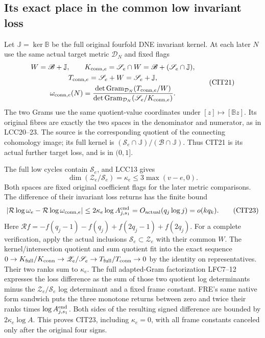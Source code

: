 \documentclass[10pt]{article}
\begin{document}
\subsection{Its exact place in the common low invariant loss}

Let $\mathbb J=\ker\mathbb B$ be the full original fourfold
DNE invariant kernel. At each later $N$ use the same actual
target metric $\mathcal D_N$ and fixed flags
\[
 \begin{gathered}
 W=\mathscr B+\mathbb J,\qquad
 K_{{\rm conn},e}=\mathscr S_e\cap W
                 =\mathscr B+(\mathscr S_e\cap\mathbb J),\\
 T_{{\rm conn},e}=\mathscr S_e+W=\mathscr S_e+\mathbb J,\\
 \omega_{{\rm conn},e}(N)=
 \frac{\det\operatorname{Gram}_{\mathcal D_N}
                       (T_{{\rm conn},e}/W)}
      {\det\operatorname{Gram}_{\mathcal D_N}
                       (\mathscr S_e/K_{{\rm conn},e})}.
 \end{gathered}\tag{CIT21}
\]
The two Grams use the same quotient-value coordinates under
$[z]\mapsto[\mathbb Bz]$. Its original fibres are exactly the
two spaces in the denominator and numerator, as in LCC20--23.
The source is the corresponding quotient of the connecting
cohomology image; its full kernel is
$(\mathscr S_e\cap\mathbb J)/(\mathscr B\cap\mathbb J)$.
Thus CIT21 is its actual further target loss, and is in $(0,1]$.

The full low cycles contain $\mathscr S_e$, and LCC13 gives
\[
 \dim(\mathscr Z_e/\mathscr S_e)=\kappa_e
                              \le3\max(v-e,0).
 \tag{CIT22}
\]
Both spaces are fixed original coefficient flags for the later
metric comparisons. The difference of their invariant loss
returns has the finite bound
\[
 \left|\mathcal R\log\omega_e-\mathcal R\log\omega_{{\rm conn},e}\right|
       \le2\kappa_e\log A_{j,s_1}^{\rm end}
                            =O_{\rm actual}(q_j\log j)=o(kq_k).
 \tag{CIT23}
\]
Here $\mathcal Rf=-f(q_j-1)-f(q_j)+f(2q_j-1)+f(2q_j)$.
For a complete verification, apply the actual inclusions
$\mathscr S_e\subset\mathscr Z_e$ with their common $W$.
The kernel/intersection quotient and sum quotient fit into
the exact sequence
$0\to K_{\rm full}/K_{\rm conn}\to
\mathscr Z_e/\mathscr S_e\to
T_{\rm full}/T_{\rm conn}\to0$ by the identity on representatives.
Their two ranks sum to $\kappa_e$. The full adapted-Gram
factorization LFC7--12 expresses the loss difference as the
sum of those two quotient log determinants minus the
$\mathscr Z_e/\mathscr S_e$ log determinant and a fixed
frame constant. FRE's same native form sandwich puts the
three monotone returns between zero and twice their ranks
times $\log A_{j,s_1}^{\rm end}$. Both sides of the resulting
signed difference are bounded by $2\kappa_e\log A$.
This proves CIT23, including $\kappa_e=0$, with all frame
constants canceled only after the original four signs.
\end{document}
